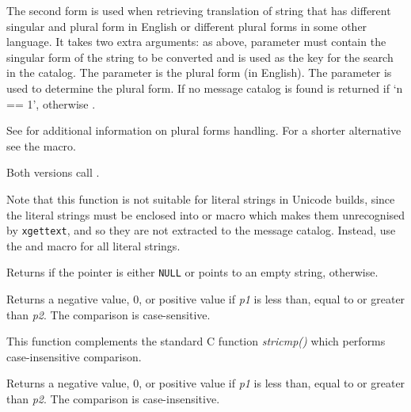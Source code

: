 The second form is used when retrieving translation of string that has
different singular and plural form in English or different plural forms in some
other language. It takes two extra arguments: as above, 
parameter must contain the singular form of the string to be converted and
is used as the key for the search in the catalog. The  parameter
is the plural form (in English). The parameter  is used to determine the
plural form.  If no message catalog is found  is returned if `n == 1',
otherwise .

See 
for additional information on plural forms handling. For a shorter alternative
see the  macro.

Both versions call .

Note that this function is not suitable for literal strings in Unicode
builds, since the literal strings must be enclosed into
 or  macro which makes them
unrecognised by \texttt{xgettext}, and so they are not extracted to the message
catalog. Instead, use the  and
 macro for all literal strings.


\label{wxisempty}


Returns \true if the pointer is either {\tt NULL} or points to an empty
string, \false otherwise.


\label{wxstrcmp}


Returns a negative value, 0, or positive value if {\it p1} is less than, equal
to or greater than {\it p2}. The comparison is case-sensitive.

This function complements the standard C function {\it stricmp()} which performs
case-insensitive comparison.


\label{wxstricmp}


Returns a negative value, 0, or positive value if {\it p1} is less than, equal
to or greater than {\it p2}. The comparison is case-insensitive.

